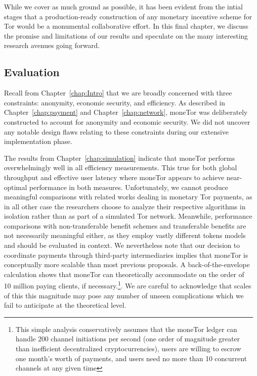 While we cover as much ground as possible, it has been evident from the intial
stages that a production-ready construction of any monetary incentive scheme for
Tor would be a monumental collaborative effort. In this final chapter, we
discuss the promise and limitations of our results and speculate on the many
interesting research avenues going forward.

\subsection{Evaluation}

Recall from Chapter~\ref{chap:Intro} that we are broadly concerned with three
constraints: anonymity, economic security, and efficiency. As described in
Chapter~\ref{chap:payment} and Chapter~\ref{chap:network}, moneTor was
deliberately constructed to account for anonymity and economic security. We did
not uncover any notable design flaws relating to these constraints during our
extensive implementation phase.

The results from Chapter~\ref{chap:simulation} indicate that moneTor performs
overwhelmingly well in all efficiency measurements. This true for both global
throughput and effective user latency where moneTor appears to achieve
near-optimal performance in both measures. Unfortunately, we cannot produce
meaningful comparisons with related works dealing in monetary Tor payments, as
in all other case the researchers choose to analyze their respective algorithms
in isolation rather than as part of a simulated Tor network. Meanwhile,
performance comparisons with non-transferable benefit schemes and transferable
benefits are not necessarily meaningful either, as they employ vastly different
tokens models and should be evaluated in context. We nevertheless note that our
decision to coordinate payments through third-party intermediaries implies that
moneTor is conceptually more scalable than most previous proposals. A
back-of-the-envelope calculation shows that moneTor can theoretically
accommodate on the order of 10 million paying clients, if
necessary.\footnote{This simple analysis conservatively assumes that the moneTor
  ledger can handle 200 channel initiations per second (one order of magnitude
  greater than inefficient decentralized cryptocurrencies), users are willing to
  escrow one month's worth of payments, and users need no more than 10 concurrent
  channels at any given time}. We are careful to acknowledge that scales
of this this magnitude may pose any number of unseen complications which we fail
to anticipate at the theoretical level.

